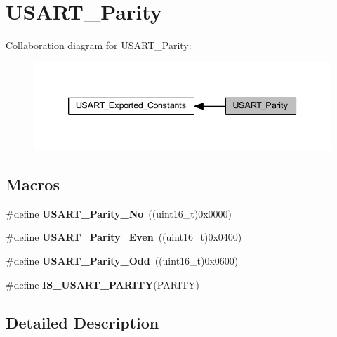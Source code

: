 \hypertarget{group___u_s_a_r_t___parity}{}\section{U\+S\+A\+R\+T\+\_\+\+Parity}
\label{group___u_s_a_r_t___parity}
Collaboration diagram for U\+S\+A\+R\+T\+\_\+\+Parity\+:\nopagebreak
\begin{figure}[H]
\begin{center}
\leavevmode
\includegraphics[width=339pt]{group___u_s_a_r_t___parity}
\end{center}
\end{figure}
\subsection*{Macros}
\begin{DoxyCompactItemize}
\item 
\mbox{\label{group___u_s_a_r_t___parity_gab9deebcb0a859360dfec85074abaa3aa}} 
\#define {\bfseries U\+S\+A\+R\+T\+\_\+\+Parity\+\_\+\+No}~((uint16\+\_\+t)0x0000)
\item 
\mbox{\label{group___u_s_a_r_t___parity_ga62193247d36fffe982e159c1f246271e}} 
\#define {\bfseries U\+S\+A\+R\+T\+\_\+\+Parity\+\_\+\+Even}~((uint16\+\_\+t)0x0400)
\item 
\mbox{\label{group___u_s_a_r_t___parity_gafcd68937a6b4b8ffff8f96e68d6a5ecd}} 
\#define {\bfseries U\+S\+A\+R\+T\+\_\+\+Parity\+\_\+\+Odd}~((uint16\+\_\+t)0x0600)
\item 
\#define {\bfseries I\+S\+\_\+\+U\+S\+A\+R\+T\+\_\+\+P\+A\+R\+I\+TY}(P\+A\+R\+I\+TY)
\end{DoxyCompactItemize}


\subsection{Detailed Description}


